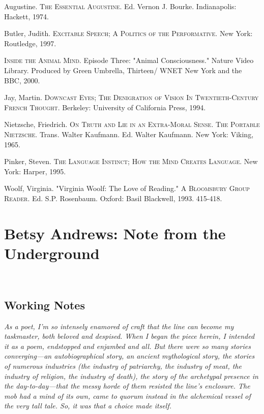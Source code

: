 \documentclass[
]{memoir}
\begin{document}
Augustine. \textsc{The Essential Augustine}. Ed. Vernon J. Bourke.
Indianapolis: Hackett, 1974.

Butler, Judith. \textsc{Excitable Speech; A Politics of the
Performative}. New York: Routledge, 1997.

\lettrine[lines=3, findent=0em, nindent=0.1em, lhang=0]{I}{nside the Animal Mind}.
Episode Three: "Animal Consciousness." Nature Video Library. Produced by
Green Umbrella, Thirteen/ WNET New York and the BBC, 2000.

Jay, Martin. \textsc{Downcast Eyes; The Denigration of Vision In
Twentieth-Century French Thought}. Berkeley: University of California
Press, 1994.

Nietzsche, Friedrich. \textsc{On Truth and Lie in an Extra-Moral Sense}.
\textsc{The Portable Nietzsche}. Trans. Walter Kaufmann. Ed. Walter
Kaufmann. New York: Viking, 1965.

Pinker, Steven. \textsc{The Language Instinct; How the Mind Creates
Language}. New York: Harper, 1995.

Woolf, Virginia. "Virginia Woolf: The Love of Reading." \textsc{A
Bloomsbury Group Reader}. Ed. S.P. Rosenbaum. Oxford: Basil Blackwell,
1993. 415-418.

\hypertarget{betsy-andrews-note-from-the-underground}{%
\chapter{Betsy Andrews: Note from the
Underground}\label{betsy-andrews-note-from-the-underground}}

~

\hypertarget{working-notes}{%
\section*{Working Notes}\label{working-notes}}

\emph{As a poet, I'm so intensely enamored of craft that the line can
become my taskmaster, both beloved and despised. When I began the piece
herein, I intended it as a poem, endstopped and enjambed and all. But
there were so many stories converging---an autobiographical story, an
ancient mythological story, the stories of numerous industries (the
industry of patriarchy, the industry of meat, the industry of religion,
the industry of death), the story of the archetypal presence in the
day-to-day---that the messy horde of them resisted the line's enclosure.
The mob had a mind of its own, came to quorum instead in the alchemical
vessel of the very tall tale. So, it was that a choice made itself.}
\end{document}
